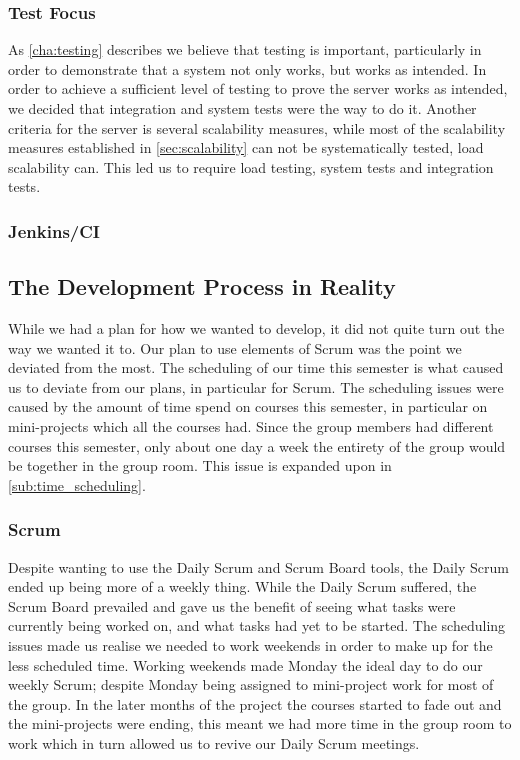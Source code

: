 \subsubsection{Test Focus}
As \cref{cha:testing} describes we believe that testing is important, particularly in order to demonstrate that a system not only works, but works as intended.
In order to achieve a sufficient level of testing to prove the server works as intended, we decided that integration and system tests were the way to do it.
Another criteria for the server is several scalability measures, while most of the scalability measures established in \cref{sec:scalability} can not be systematically tested, load scalability can.
This led us to require load testing, system tests and integration tests.
\subsubsection{Jenkins/CI}
\subsection{The Development Process in Reality}
While we had a plan for how we wanted to develop, it did not quite turn out the way we wanted it to.
Our plan to use elements of Scrum was the point we deviated from the most.
The scheduling of our time this semester is what caused us to deviate from our plans, in particular for Scrum.
The scheduling issues were caused by the amount of time spend on courses this semester, in particular on mini-projects which all the courses had.
Since the group members had different courses this semester, only about one day a week the entirety of the group would be together in the group room.
This issue is expanded upon in \cref{sub:time_scheduling}.
\subsubsection{Scrum}
Despite wanting to use the Daily Scrum and Scrum Board tools, the Daily Scrum ended up being more of a weekly thing.
While the Daily Scrum suffered, the Scrum Board prevailed and gave us the benefit of seeing what tasks were currently being worked on, and what tasks had yet to be started.
The scheduling issues made us realise we needed to work weekends in order to make up for the less scheduled time.
Working weekends made Monday the ideal day to do our weekly Scrum; despite Monday being assigned to mini-project work for most of the group.
In the later months of the project the courses started to fade out and the mini-projects were ending, this meant we had more time in the group room to work which in turn allowed us to revive our Daily Scrum meetings.
